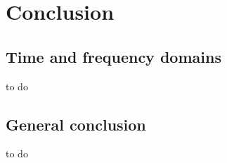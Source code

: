 \section{Conclusion}

\subsection{Time and frequency domains}
to do

\subsection{General conclusion}
to do
